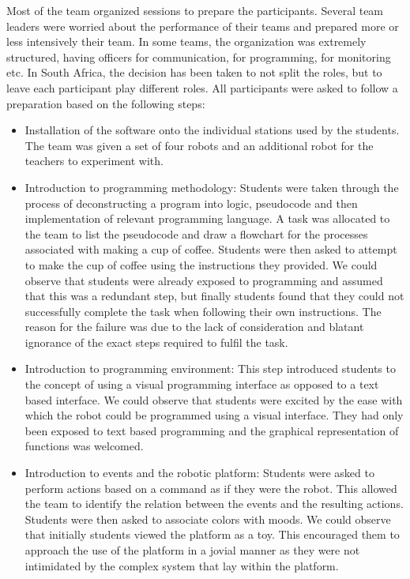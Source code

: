 \documentclass{intech-journal}
\begin{document}
Most of the team organized sessions to prepare the participants.
Several team leaders were worried about the performance of their teams and prepared more or less intensively their team.
In some teams, the organization was extremely structured, having officers for communication, for programming, for monitoring etc.
In South Africa, the decision has been taken to not split the roles, but to leave each participant play different roles. 
All participants were asked to follow a preparation based on the following steps:
\begin{itemize}
\item Installation of the software onto the individual stations used by the students. The team was given a set of four robots and an additional robot for the teachers to experiment with.
\item Introduction to programming methodology: Students were taken through the process of deconstructing a program into logic, pseudocode and then implementation of relevant programming language. 
A task was allocated to the team to list the pseudocode and draw a flowchart for the processes associated with making a cup of coffee. Students were then asked to attempt to make the cup of coffee using the instructions they provided. 
We could observe that students were already exposed to programming and assumed that this was a redundant step, but finally students found that they could not successfully complete the task when following their own instructions. 
The reason for the failure was due to the lack of consideration and blatant ignorance of the exact steps required to fulfil the task.
\item Introduction to programming environment: This step introduced students to the concept of using a visual programming interface as opposed to a text based interface.  
We could observe that students were excited by the ease with which the robot could be programmed using a visual interface. 
They had only been exposed to text based programming and the graphical representation of functions was welcomed.
\item Introduction to events and the robotic platform: Students were asked to perform actions based on a command as if they were the robot. 
This allowed the team to identify the relation between the events and the resulting actions. 
Students were then asked to associate colors with moods. We could observe that initially students viewed the platform as a toy. 
This encouraged them to approach the use of the platform in a jovial manner as they were not intimidated by the complex system that lay within the platform. 

\end{itemize}
\end{document}
